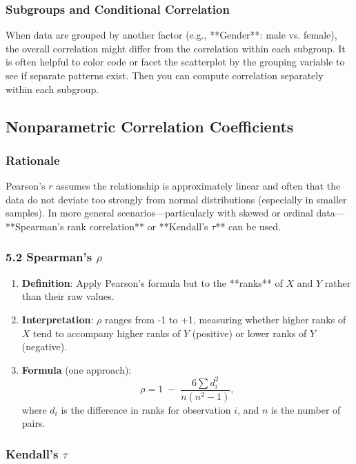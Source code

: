 \documentclass[10pt]{extarticle}
\begin{document}
\subsubsection{Subgroups and Conditional Correlation}

When data are grouped by another factor (e.g., **Gender**: male vs. female), the overall correlation might differ from the correlation within each subgroup. It is often helpful to color code or facet the scatterplot by the grouping variable to see if separate patterns exist. Then you can compute correlation separately within each subgroup.


\subsection{Nonparametric Correlation Coefficients}

\subsubsection{Rationale}

Pearson's $r$ assumes the relationship is approximately linear and often that the data do not deviate too strongly from normal distributions (especially in smaller samples). In more general scenarios---particularly with skewed or ordinal data---**Spearman's rank correlation** or **Kendall's $\tau$** can be used.

\subsubsection{5.2 Spearman's $\rho$}

\begin{enumerate}
    \item \textbf{Definition}: Apply Pearson's formula but to the **ranks** of $X$ and $Y$ rather than their raw values.
    \item \textbf{Interpretation}: $\rho$ ranges from -1 to +1, measuring whether higher ranks of $X$ tend to accompany higher ranks of $Y$ (positive) or lower ranks of $Y$ (negative).
    \item \textbf{Formula} (one approach):
          \[
              \rho = 1 \;-\; \frac{6 \sum d_i^2}{n (n^2 - 1)},
          \]
          where $d_i$ is the difference in ranks for observation $i$, and $n$ is the number of pairs.
\end{enumerate}

\subsubsection{Kendall's $\tau$}
\end{document}
